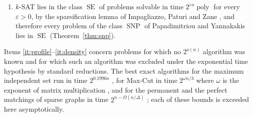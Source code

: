 \documentclass[11pt,reqno]{amsart}
\numberwithin{equation}{section}
\theoremstyle{plain}
\theoremstyle{definition}
\theoremstyle{remark}
\DeclareMathOperator{\poly}{poly}
\DeclareMathOperator{\SE}{SE}
\DeclareMathOperator{\SNP}{SNP}
\begin{document}
\begin{enumerate}[label=(\roman*),leftmargin=2.2em]
clauses and that of an integer program with $d(n)n$ sparse rows are found in time
$2^{o(n)}$ whenever $d(n)=o(\sqrt{\log n/\log\log n})$ (Corollaries
\ref{cor:density} and \ref{cor:densitysat}); and, through the complement, the cut
profile of every graph whose complement has that many edges, a class that contains
graphs with $\Theta(n^2)$ edges (Corollary~\ref{cor:complement}), and more generally the
cut profile of every graph that differs in that many pairs from a blow-up of a
graph on $o(n/\log n)$ vertices, or from a weighted graph whose weights are a
quadratic form in $s$ vertex weights with $s\log(n\Omega)=o(n)$
(Theorem~\ref{thm:lowrank} and Corollary~\ref{cor:blowup}); a count shows that
these classes contain almost no graphs (Remark~\ref{rem:lowrankcount});
\item\label{it:snp} $k$-SAT lies in the class $\SE$ of problems solvable in
time $2^{\varepsilon n}\poly$ for every $\varepsilon>0$, by the sparsification
lemma of Impagliazzo, Paturi and Zane \cite{IPZ01}, and therefore every problem of
the class $\SNP$ of Papadimitriou and Yannakakis \cite{PY91} lies in $\SE$
(Theorem~\ref{thm:snp}).
\end{enumerate}
Items \ref{it:profile}--\ref{it:density} concern problems for which no
$2^{o(n)}$ algorithm was known and for which such an algorithm was excluded under
the exponential time hypothesis by standard reductions. The best exact algorithms
for the maximum independent set run in time $2^{0.1996n}$ \cite{XN17}, for
Max-Cut in time $2^{\omega n/3}$ where $\omega$ is the exponent of matrix
multiplication \cite{Wil05}, and for the permanent and the perfect matchings of
sparse graphs in time $2^{n-\Omega(n/\Delta)}$ \cite{CP15}; each of these bounds
is exceeded here asymptotically.
\end{document}
